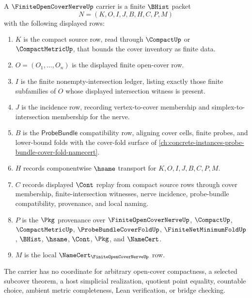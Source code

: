 \begin{definition}
\label{def:finite-open-cover-nerve-carrier}
A $\FiniteOpenCoverNerveUp$ carrier is a finite $\BHist$ packet
$$
N=(K,O,I,J,B,H,C,P,M)
$$
with the following displayed rows:
\begin{enumerate}
\item $K$ is the compact source row, read through $\CompactUp$ or $\CompactMetricUp$, that bounds the cover inventory as finite data.
\item $O=(O_1,\ldots,O_n)$ is the displayed finite open-cover row.
\item $I$ is the finite nonempty-intersection ledger, listing exactly those finite subfamilies of $O$ whose displayed intersection witness is present.
\item $J$ is the incidence row, recording vertex-to-cover membership and simplex-to-intersection membership for the nerve.
\item $B$ is the $\mathsf{ProbeBundle}$ compatibility row, aligning cover cells, finite probes, and lower-bound folds with the cover-fold surface of \autoref{ch:concrete-instances-probe-bundle-cover-fold-namecert}.
\item $H$ records componentwise $\hsame$ transport for $K,O,I,J,B,C,P,M$.
\item $C$ records displayed $\Cont$ replay from compact source rows through cover membership, finite-intersection witnesses, nerve incidence, probe-bundle compatibility, provenance, and local naming.
\item $P$ is the $\Pkg$ provenance over $\FiniteOpenCoverNerveUp$, $\CompactUp$, $\CompactMetricUp$, $\ProbeBundleCoverFoldUp$, $\FiniteNetMinimumFoldUp$, $\BHist$, $\hsame$, $\Cont$, $\Pkg$, and $\NameCert$.
\item $M$ is the local $\NameCert_{\FiniteOpenCoverNerveUp}$ row.
\end{enumerate}
The carrier has no coordinate for arbitrary open-cover compactness, a selected subcover theorem, a host simplicial realization, quotient point equality, countable choice, ambient metric completeness, Lean verification, or bridge checking.
\end{definition}

